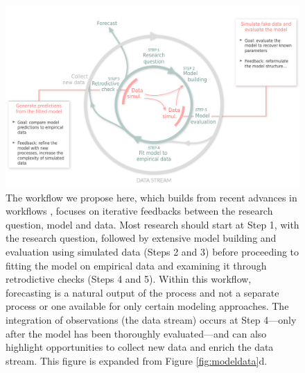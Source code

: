\documentclass[11pt]{article}
\begin{document}
\begin{figure}[h]
	\centering
	\vspace*{-0.4cm}
    \hspace*{-1.5cm}
	\includegraphics{../../figures/figure_worflow_wsteps}
	\caption{The workflow we propose here, which builds from recent advances in workflows \citep[][]{betanworkflow,Gelman2020,Schad2020,grinsztajn2021,vandeschoot2021,Wolkovich2024}, focuses on iterative feedbacks between the research question, model and data. Most research should start at Step 1, with the research question, followed by extensive model building and evaluation using simulated data (Steps 2 and 3) before proceeding to fitting the model on empirical data and examining it through retrodictive checks (Steps 4 and 5). Within this workflow, forecasting is a natural output of the process and not a separate process or one available for only certain modeling approaches.  The integration of observations (the data stream) occurs at Step 4---only after the model has been thoroughly evaluated---and can also highlight opportunities to collect new data and enrich the data stream. This figure is expanded from Figure \ref{fig:modeldata}d.}
	\vspace*{-0cm}
	\label{fig:workflow}
\end{figure}
\end{document}
